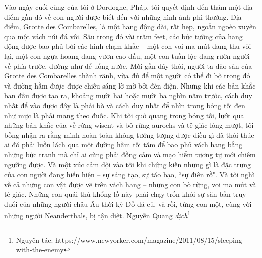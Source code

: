 \begin{multicols}{2}
	\vskip 0.1cm
	Vào ngày cuối cùng của tôi ở Dordogne, Pháp, tôi quyết định đến thăm một địa điểm gần đó về con người được biết đến với những hình ảnh phi thường. Địa điểm, Grotte des Combarelles, là một hang động dài, rất hẹp, ngoằn ngoèo xuyên qua một vách núi đá vôi. Sâu trong đó vài trăm feet, các bức tường của hang động được bao phủ bởi các hình chạm khắc -- một con voi ma mút đang thu vòi lại, một con ngựa hoang đang vươn cao đầu, một con tuần lộc đang rướn người về phía trước, dường như để uống nước. Mới gần đây thôi, người ta đào sàn của Grotte des Combarelles thành rãnh, vừa đủ để một người có thể đi bộ trong đó và đường hầm được được chiếu sáng lờ mờ bởi đèn điện. Nhưng khi các bản khắc ban đầu được tạo ra, khoảng mười hai hoặc mười ba nghìn năm trước, cách duy nhất để vào được đây là phải bò và cách duy nhất để nhìn trong bóng tối đen như mực là phải mang theo đuốc. Khi tôi quờ quạng trong bóng tối, lướt qua những bản khắc của về rừng wisent và bò rừng aurochs và tê giác lông mượt, tôi bỗng nhận ra rằng mình hoàn toàn không tưởng tượng được điều gì đã thôi thúc ai đó phải luồn lách qua một đường hầm tối tăm để bao phủ vách hang bằng những bức tranh mà chỉ ai cũng phải đồng cảm và mạo hiểm tương tự mới chiêm ngưỡng được. Và một xúc cảm dội vào tôi khi chứng kiến những gì là đặc trưng của con người đang hiển hiện -- sự sáng tạo, sự táo bạo, ``sự điên rồ". Và tôi nghĩ về cả những con vật được vẽ trên vách hang -- những con bò rừng, voi ma mút và tê giác. Những con quái thú khổng lồ này phải chạy trốn khỏi sự săn bắn truy đuổi của những người châu Âu thời kỳ Đồ đá cũ, và rồi, từng con một, cùng với những người Neanderthals, bị tận diệt.
	\vskip 0.1cm
	\hfill Nguyễn Quang \textit{dịch}\footnote[2]{\color{timhieukhoahoc}Nguyên tác: https://www.newyorker.com/magazine/2011/08/15/sleeping-with-the-enemy}
\end{multicols}



